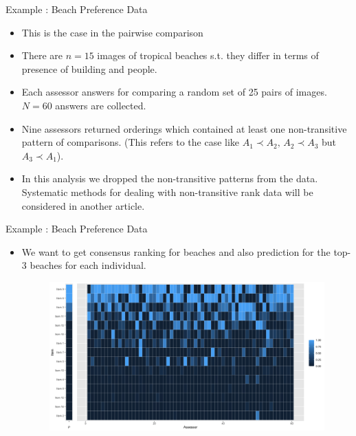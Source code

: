 \documentclass[11pt]{beamer}
\begin{document}
\begin{frame}{Example : Beach Preference Data}
\begin{itemize}
    \item This is the case in the pairwise comparison
    \item There are $n=15$ images of tropical beaches s.t. they differ in terms of presence of building and people. 
    \item Each assessor answers for comparing a random set of 25 pairs of images. $N=60$ answers are collected. 
    \item Nine assessors returned orderings which contained at least one non-transitive pattern of comparisons. (This refers to the case like $A_1\prec A_2, \, A_2\prec A_3$ but $A_3\prec A_1$).
    \item In this analysis we dropped the non-transitive patterns from the data. Systematic methods for dealing with non-transitive rank data will be considered in another article.
\end{itemize}
\end{frame}

\begin{frame}{Example : Beach Preference Data}
\begin{itemize}
    \item We want to get consensus ranking for beaches and also prediction for the top-3 beaches for each individual.
    \begin{figure}
        \includegraphics[width=11cm]{Rplot_beach.png}
    \end{figure}
\end{itemize}
\end{frame}
\end{document}
